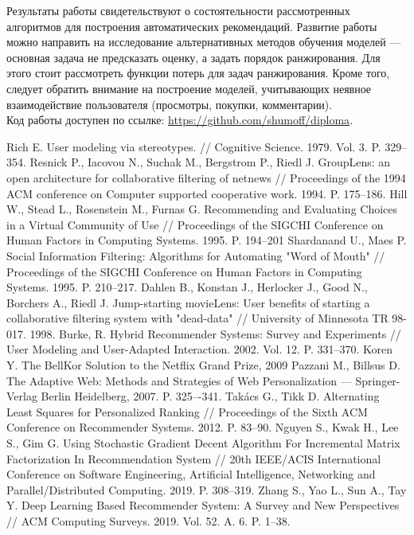\documentclass[a4paper,article,14pt]{extarticle}
\begin{document}
\pagebreak
{}
Результаты работы свидетельствуют о состоятельности рассмотренных алгоритмов для построения автоматических рекомендаций.
Развитие работы можно направить на исследование альтернативных методов обучения моделей --- основная задача не предсказать оценку, а задать порядок ранжирования.
Для этого стоит рассмотреть функции потерь для задач ранжирования.
Кроме того, следует обратить внимание на построение моделей, учитывающих неявное взаимодействие пользователя (просмотры, покупки, комментарии).
\\Код работы доступен по ссылке: \url{https://github.com/shumoff/diploma}.

\pagebreak

\begin{thebibliography}{1}
 Rich E. User modeling via stereotypes. // Cognitive Science. 1979. Vol. 3. P. 329--354.
 Resnick P., Iacovou N., Suchak M., Bergstrom P., Riedl J. GroupLens: an open architecture for collaborative filtering of netnews // Proceedings of the 1994 ACM conference on Computer supported cooperative work. 1994. P. 175--186.
 Hill W., Stead L., Rosenstein M., Furnas G. Recommending and Evaluating Choices in a Virtual Community of Use // Proceedings of the SIGCHI Conference on Human Factors in Computing Systems. 1995. P. 194--201
 Shardanand U., Maes P. Social Information Filtering: Algorithms for Automating "Word of Mouth" // Proceedings of the SIGCHI Conference on Human Factors in Computing Systems. 1995. P. 210--217.
 Dahlen B., Konstan J., Herlocker J., Good N., Borchers A., Riedl J. Jump-starting movieLens: User benefits of starting a collaborative filtering system with "dead-data" // University of Minnesota TR 98-017. 1998.
 Burke, R. Hybrid Recommender Systems: Survey and Experiments // User Modeling and User-Adapted Interaction. 2002. Vol. 12. P. 331--370.
 Koren Y. The BellKor Solution to the Netflix Grand Prize, 2009
 Pazzani M., Billsus D. The Adaptive Web: Methods and Strategies of Web Personalization --- Springer-Verlag Berlin Heidelberg, 2007. P. 325–-341.
 Takács G., Tikk D. Alternating Least Squares for Personalized Ranking // Proceedings of the Sixth ACM Conference on Recommender Systems. 2012. P. 83--90.
 Nguyen S., Kwak H., Lee S., Gim G. Using Stochastic Gradient Decent Algorithm For Incremental Matrix Factorization In Recommendation System // 20th IEEE/ACIS International Conference on Software Engineering, Artificial Intelligence, Networking and Parallel/Distributed Computing. 2019. P. 308--319.
 Zhang S., Yao L., Sun A., Tay Y. Deep Learning Based Recommender System: A Survey and New Perspectives // ACM Computing Surveys. 2019. Vol. 52. A. 6. P. 1--38.


\end{thebibliography}
\end{document}
